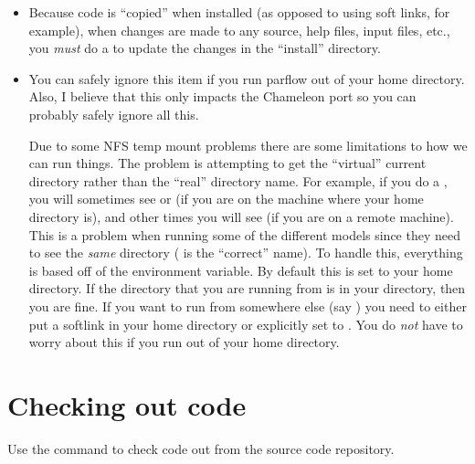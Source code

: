 \begin{itemize}
\item
Because code is ``copied'' when installed (as opposed to using
soft links, for example), when changes are made to any source,
help files, input files, etc., you {\em must} do a 
to update the changes in the ``install'' directory.

\item
You can safely ignore this item if you run parflow out of your
home directory.
Also, I believe that this only impacts the Chameleon port so you
can probably safely ignore all this.

\noindent
Due to some NFS temp mount problems there are some limitations to how
we can run things.
The problem is attempting to get the ``virtual'' current directory
rather than the ``real'' directory name.
For example, if you do a , you will sometimes see
 or
(if you are on the machine where your home directory is),
and other times you will see 
(if you are on a remote machine).
This is a problem when running some of the different
models since they need to see the {\em same} directory
( is the ``correct'' name).
To handle this, everything is based off of the 
environment variable.
By default this is set to your home directory.
If the directory that you are running from is in your 
directory, then you are fine.
If you want to run from somewhere else (say )
you need to either put a softlink in your home directory or explicitly set
 to .
You do {\em not} have to worry about this if you run \parflow{} out of
your home directory.

\end{itemize}


\section{Checking out code}
\label{Checking out code}

Use the  command to check code out from the \parflow{} source
code repository.


